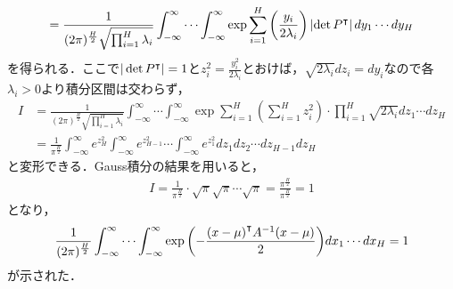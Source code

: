 \documentclass[dvipdfmx]{jsreport}
\begin{document}
\begin{souanswer}
\begin{align*}
\begin{split}
    = \frac{1}{(2\pi)^\frac{H}{2}\sqrt{\prod_{i= 1}^H \lambda_i}}\int_{-\infty}^\infty\cdots \int_{-\infty}^\infty \exp{\sum_{i= 1}^H\left(\frac{y_i}{2\lambda_i}\right)}\left|\det{{P}^\intercal}\right|dy_1\cdots dy_H
\end{split}
\end{align*}
    を得られる．ここで$|\det{{P}^\intercal}|= 1$と$z^2_i= \frac{y^2_i}{2\lambda_i}$とおけば，$\sqrt{2\lambda_i}dz_i= dy_i$なので各$\lambda_i> 0$より積分区間は交わらず，
\begin{align*}
    I
    &= \frac{1}{(2\pi)^\frac{H}{2}\sqrt{\prod_{i= 1}^H \lambda_i}}\int_{-\infty}^\infty\cdots \int_{-\infty}^\infty \exp{}\sum_{i= 1}^H\left(\sum_{i= 1}^H z^2_i\right)\cdot \prod_{i= 1}^H \sqrt{2\lambda_i}dz_1\cdots dz_H\\
    &= \frac{1}{\pi^\frac{H}{2}}\int_{-\infty}^\infty e^{z^2_H}\int_{-\infty}^\infty e^{z^2_{H- 1}}\cdots \int_{-\infty}^\infty e^{z^2_1}dz_1dz_2\cdots dz_{H- 1}dz_H
\end{align*}
    と変形できる．Gauss積分の結果を用いると，
\begin{align*}
    I
    = \frac{1}{\pi^\frac{H}{2}}\cdot \sqrt{\pi}\sqrt{\pi}\cdots \sqrt{\pi}
    = \frac{\pi^\frac{H}{2}}{\pi^\frac{H}{2}}
    = 1 
\end{align*}
    となり，
\begin{equation*}
    \frac{1}{(2\pi)^\frac{H}{2}}\int_{-\infty}^\infty\cdots \int_{-\infty}^\infty \exp{\left(-\frac{{(x- \mu)}^\intercal A^{-1}(x- \mu)}{2}\right)}dx_1\cdots dx_H= 1
\end{equation*}
    が示された．
\end{souanswer}
\end{document}
